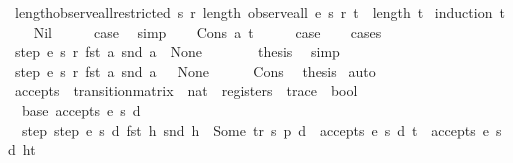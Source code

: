 \begin{isabellebody}
\endisadelimproof
\isanewline
{}\isamarkupfalse%
\ length{\isacharunderscore}observe{\isacharunderscore}all{\isacharunderscore}restricted{\isacharcolon}\ {\isachardoublequoteopen}{\isasymAnd}s\ r{\isachardot}\ length\ {\isacharparenleft}observe{\isacharunderscore}all\ e\ s\ r\ t{\isacharparenright}\ {\isasymle}\ length\ t{\isachardoublequoteclose}\isanewline
%
\isadelimproof
%
\endisadelimproof
%
\isatagproof
{}\isamarkupfalse%
\ {\isacharparenleft}induction\ t{\isacharparenright}\isanewline
\ \ \isamarkupfalse%
\ Nil\isanewline
\ \ \isamarkupfalse%
\ \isamarkupfalse%
\ {\isacharquery}case\ \isamarkupfalse%
\ simp\isanewline
{}\isamarkupfalse%
\isanewline
\ \ \isamarkupfalse%
\ {\isacharparenleft}Cons\ a\ t{\isacharparenright}\isanewline
\ \ \isamarkupfalse%
\ \isamarkupfalse%
\ {\isacharquery}case\isanewline
\ \ \isamarkupfalse%
\ cases\isanewline
\ \ \ \ \isamarkupfalse%
\ {\isachardoublequoteopen}step\ e\ s\ r\ {\isacharparenleft}fst\ a{\isacharparenright}\ {\isacharparenleft}snd\ a{\isacharparenright}\ {\isacharequal}\ None{\isachardoublequoteclose}\isanewline
\ \ \ \ \isamarkupfalse%
\ \isamarkupfalse%
\ {\isacharquery}thesis\ \isamarkupfalse%
\ simp\isanewline
\ \ \isamarkupfalse%
\isanewline
\ \ \ \ \isamarkupfalse%
\ {\isachardoublequoteopen}step\ e\ s\ r\ {\isacharparenleft}fst\ a{\isacharparenright}\ {\isacharparenleft}snd\ a{\isacharparenright}\ {\isasymnoteq}\ \ None{\isachardoublequoteclose}\isanewline
\ \ \ \ \isamarkupfalse%
\ Cons\ \isamarkupfalse%
\ {\isacharquery}thesis\ \isamarkupfalse%
{\isacharparenleft}auto{\isacharparenright}\isanewline
\ \ \isamarkupfalse%
\isanewline
{}\isamarkupfalse%
%
\endisatagproof
{\isafoldproof}%
%
\isadelimproof
\isanewline
%
\endisadelimproof
\isanewline
{}\isamarkupfalse%
\ accepts\ {\isacharcolon}{\isacharcolon}\ {\isachardoublequoteopen}transition{\isacharunderscore}matrix\ {\isasymRightarrow}\ nat\ {\isasymRightarrow}\ registers\ {\isasymRightarrow}\ trace\ {\isasymRightarrow}\ bool{\isachardoublequoteclose}\ \isanewline
\ \ base{\isacharcolon}\ {\isachardoublequoteopen}accepts\ e\ s\ d\ {\isacharbrackleft}{\isacharbrackright}{\isachardoublequoteclose}\ {\isacharbar}\isanewline
\ \ step{\isacharcolon}\ {\isachardoublequoteopen}step\ e\ s\ d\ {\isacharparenleft}fst\ h{\isacharparenright}\ {\isacharparenleft}snd\ h{\isacharparenright}\ {\isacharequal}\ Some\ {\isacharparenleft}tr{\isacharcomma}\ s{\isacharprime}{\isacharcomma}\ p{\isacharprime}{\isacharcomma}\ d{\isacharprime}{\isacharparenright}\ {\isasymLongrightarrow}\ accepts\ e\ s{\isacharprime}\ d{\isacharprime}\ t\ {\isasymLongrightarrow}\ accepts\ e\ s\ d\ {\isacharparenleft}h{\isacharhash}t{\isacharparenright}{\isachardoublequoteclose}\isanewline

\end{isabellebody}

